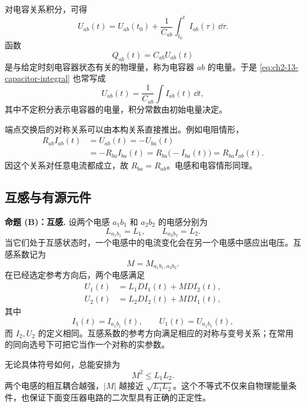 对电容关系积分，可得
\begin{equation}
 U_{ab}(t)=U_{ab}(t_0)
 +\frac1{C_{ab}}\int_{t_0}^{t}I_{ab}(\tau)\,\dd\tau.
 \label{eq:ch2-13-capacitor-integral}
\end{equation}
函数
\begin{equation}
 Q_{ab}(t)=C_{ab}U_{ab}(t)
 \label{eq:ch2-13-charge-definition}
\end{equation}
是与给定时刻电容器状态有关的物理量，称为电容器 \(ab\) 的电量。于是 \eqref{eq:ch2-13-capacitor-integral} 也常写成
\begin{equation}
 U_{ab}(t)=\frac1{C_{ab}}\int I_{ab}(t)\,\dd t,
 \label{eq:ch2-13-capacitor-indefinite}
\end{equation}
其中不定积分表示电容器的电量，积分常数由初始电量决定。

端点交换后的对称关系可以由本构关系直接推出。例如电阻情形，
\begin{align*}
 R_{ab}I_{ab}(t)
 &=U_{ab}(t)
  =-U_{ba}(t)\\
 &=-R_{ba}I_{ba}(t)
 =R_{ba}\bigl(-I_{ba}(t)\bigr)
 =R_{ba}I_{ab}(t).
\end{align*}
因这个关系对任意电流都成立，故 \(R_{ba}=R_{ab}\)。电感和电容情形同理。

\subsection*{互感与有源元件}

\medskip
\noindent\textbf{命题 (B)：互感.}
设两个电感 \(a_1b_1\) 和 \(a_2b_2\) 的电感分别为
\[
 L_{a_1b_1}=L_1,
 \qquad
 L_{a_2b_2}=L_2.
\]
当它们处于互感状态时，一个电感中的电流变化会在另一个电感中感应出电压。互感系数记为
\[
 M=M_{a_1b_1,a_2b_2}.
\]
在已经选定参考方向后，两个电感满足
\begin{align}
 U_1(t)&=L_1D I_1(t)+MDI_2(t),
 \label{eq:ch2-13-mutual-first}\\
 U_2(t)&=L_2D I_2(t)+MDI_1(t),
 \label{eq:ch2-13-mutual-second}
\end{align}
其中
\[
 I_1(t)=I_{a_1b_1}(t),
 \qquad
 U_1(t)=U_{a_1b_1}(t),
\]
而 \(I_2,U_2\) 的定义相同。互感系数的参考方向满足相应的对称与变号关系；在常用的同向选号下可把它当作一个对称的实参数。

无论具体符号如何，总能安排为
\begin{equation}
 M^2\le L_1L_2.
 \label{eq:ch2-13-coupling-inequality}
\end{equation}
两个电感的相互耦合越强，\(|M|\) 越接近 \(\sqrt{L_1L_2}\)。这个不等式不仅来自物理能量条件，也保证下面变压器电路的二次型具有正确的正定性。

